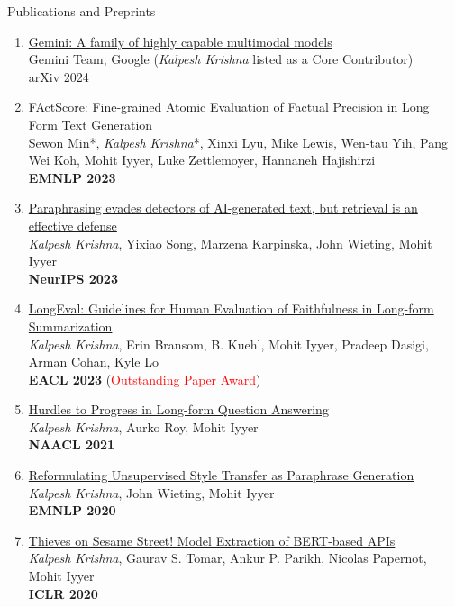 \documentclass{resume} %
\begin{document}
\begin{rSection}{Publications and Preprints}
\begin{enumerate}[leftmargin=*]
\item \href{https://storage.googleapis.com/deepmind-media/gemini/gemini_1_report.pdf}{Gemini: A family of highly capable multimodal models} \\
Gemini Team, Google (\emph{Kalpesh Krishna} listed as a Core Contributor) \\
arXiv 2024

\item \href{https://arxiv.org/abs/2305.14251}{FActScore: Fine-grained Atomic Evaluation of Factual Precision in Long Form Text Generation} \\
Sewon Min*, \emph{Kalpesh Krishna}*, Xinxi Lyu, Mike Lewis, Wen-tau Yih, Pang Wei Koh, Mohit Iyyer, Luke Zettlemoyer, Hannaneh Hajishirzi \\
\textbf{EMNLP 2023}

\item \href{https://arxiv.org/abs/2303.13408}{Paraphrasing evades detectors of AI-generated text, but retrieval is an effective defense} \\
\textit{Kalpesh Krishna}, Yixiao Song, Marzena Karpinska, John Wieting, Mohit Iyyer \\
\textbf{NeurIPS 2023}

\item \href{https://arxiv.org/abs/2301.13298}{LongEval: Guidelines for Human Evaluation of Faithfulness in Long-form Summarization} \\
\textit{Kalpesh Krishna}, Erin Bransom, B. Kuehl, Mohit Iyyer, Pradeep Dasigi, Arman Cohan, Kyle Lo \\
\textbf{EACL 2023} (\textcolor{red}{Outstanding Paper Award})

\item \href{https://arxiv.org/abs/2103.06332}{Hurdles to Progress in Long-form Question Answering} \\
\textit{Kalpesh Krishna}, Aurko Roy, Mohit Iyyer \\
\textbf{NAACL 2021}
\item \href{https://arxiv.org/abs/2010.05700}{Reformulating Unsupervised Style Transfer as Paraphrase Generation} \\ \textit{Kalpesh Krishna}, John Wieting, Mohit Iyyer \\ \textbf{EMNLP 2020} 
\item \href{https://arxiv.org/abs/1910.12366}{Thieves on Sesame Street! Model Extraction of BERT-based APIs} \\ \textit{Kalpesh Krishna}, Gaurav S. Tomar, Ankur P. Parikh, Nicolas Papernot, Mohit Iyyer \\ \textbf{ICLR 2020}


\end{enumerate}
\end{rSection}
\end{document}
